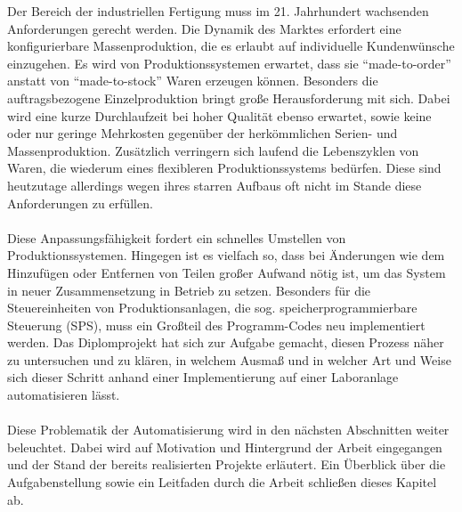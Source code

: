 
Der Bereich der industriellen Fertigung muss im 21. Jahrhundert wachsenden Anforderungen gerecht werden. Die Dynamik des Marktes erfordert eine konfigurierbare Massenproduktion, die es erlaubt auf individuelle Kundenwünsche einzugehen. Es wird von Produktionssystemen erwartet, dass sie "`made-to-order"' anstatt von "`made-to-stock"' Waren erzeugen können. Besonders die auftragsbezogene Einzelproduktion bringt große Herausforderung mit sich. Dabei wird eine kurze Durchlaufzeit bei hoher Qualität ebenso erwartet, sowie keine oder nur geringe Mehrkosten gegenüber der herkömmlichen Serien- und Massenproduktion. Zusätzlich verringern sich laufend die Lebenszyklen von Waren, die wiederum eines flexibleren Produktionssystems bedürfen. Diese sind heutzutage allerdings wegen ihres starren Aufbaus oft nicht im Stande diese Anforderungen zu erfüllen. \cite{wlepuschitz_2014} \\\\
Diese Anpassungsfähigkeit fordert ein schnelles Umstellen von Produktionssystemen. Hingegen ist es vielfach so, dass bei Änderungen wie dem Hinzufügen oder Entfernen von Teilen großer Aufwand nötig ist, um das System in neuer Zusammensetzung in Betrieb zu setzen. Besonders für die Steuereinheiten von Produktionsanlagen, die sog. speicherprogrammierbare Steuerung (SPS), muss ein Großteil des Programm-Codes neu implementiert werden. \cite{Lepuschitz_PhaseAgent}  
Das Diplomprojekt hat sich zur Aufgabe gemacht, diesen Prozess näher zu untersuchen und zu klären, in welchem Ausmaß und in welcher Art und Weise sich dieser Schritt anhand einer Implementierung auf einer Laboranlage automatisieren lässt. 
\\\\ 
Diese Problematik der Automatisierung wird in den nächsten Abschnitten weiter beleuchtet. Dabei wird auf Motivation und Hintergrund der Arbeit eingegangen und der Stand der bereits realisierten Projekte erläutert. Ein Überblick über die Aufgabenstellung sowie ein Leitfaden durch die Arbeit schließen dieses Kapitel ab. 
